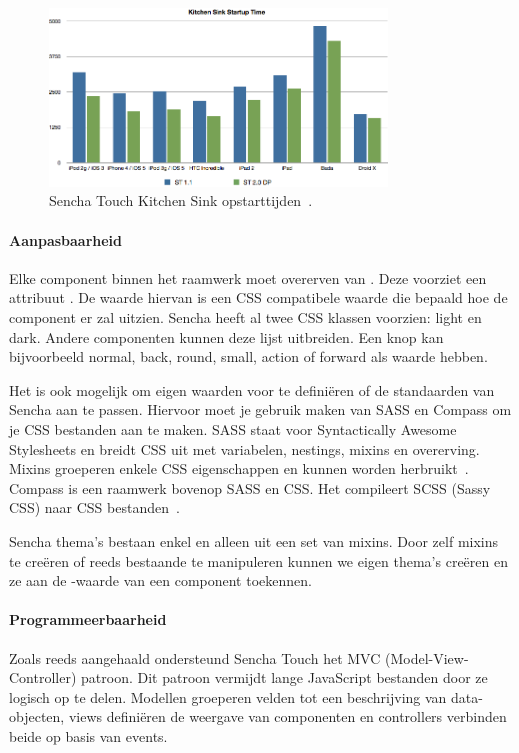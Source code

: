 \begin{figure}
  \centering
  \includegraphics[width=0.8\textwidth]{figuren/sencha-touch-startup-times.png}
  \caption{Sencha Touch Kitchen Sink opstarttijden~\cite{SenchaInc.2013}.}
  \label{fig:sencha_performance}
\end{figure}

\paragraph{Aanpasbaarheid}
Elke component binnen het raamwerk moet overerven van .  Deze voorziet een attribuut .  De waarde hiervan is een CSS compatibele waarde die bepaald hoe de component er zal uitzien.  Sencha heeft al twee CSS klassen voorzien:  light en dark.  Andere componenten kunnen deze lijst uitbreiden.  Een knop kan bijvoorbeeld normal,  back,  round,  small,  action of forward als  waarde hebben.

Het is ook mogelijk om eigen waarden voor  te definiëren of de standaarden van Sencha aan te passen.  Hiervoor moet je gebruik maken van SASS en Compass om je CSS bestanden aan te maken.  SASS staat voor Syntactically Awesome Stylesheets en breidt CSS uit met variabelen,  nestings,  mixins en overerving.  Mixins groeperen enkele CSS eigenschappen en kunnen worden herbruikt~\cite{Eppstein2013}.  Compass is een raamwerk bovenop SASS en CSS.  Het compileert SCSS (Sassy CSS) naar CSS bestanden~\cite{Eppstein2013a}.        

Sencha thema's bestaan enkel en alleen uit een set van mixins.  Door zelf mixins te creëren of reeds bestaande te manipuleren kunnen we eigen thema's creëren en ze aan de -waarde van een component toekennen.

\paragraph{Programmeerbaarheid}
Zoals reeds aangehaald ondersteund Sencha Touch het MVC (Model-View-Controller) patroon.  Dit patroon vermijdt lange JavaScript bestanden door ze logisch op te delen.  Modellen groeperen velden tot een beschrijving van data-objecten,  views definiëren de weergave van componenten en controllers verbinden beide op basis van events.

